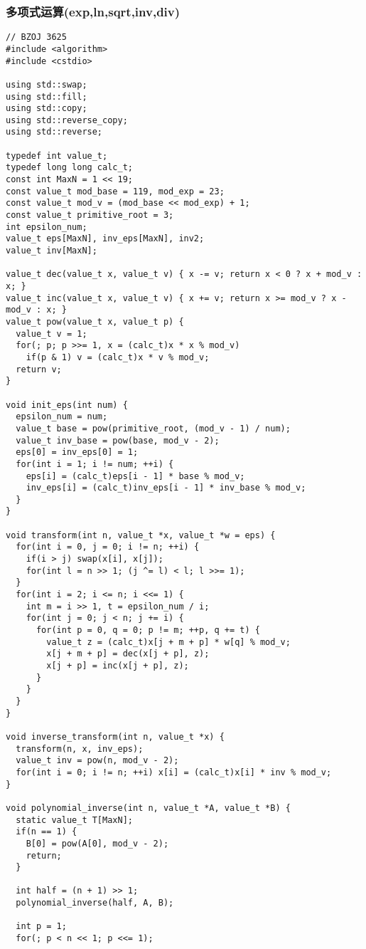 \subsubsection{多项式运算(exp,ln,sqrt,inv,div)}
\begin{verbatim}
// BZOJ 3625
#include <algorithm>
#include <cstdio>

using std::swap;
using std::fill;
using std::copy;
using std::reverse_copy;
using std::reverse;

typedef int value_t;
typedef long long calc_t;
const int MaxN = 1 << 19;
const value_t mod_base = 119, mod_exp = 23;
const value_t mod_v = (mod_base << mod_exp) + 1;
const value_t primitive_root = 3;
int epsilon_num;
value_t eps[MaxN], inv_eps[MaxN], inv2;
value_t inv[MaxN];

value_t dec(value_t x, value_t v) { x -= v; return x < 0 ? x + mod_v : x; }
value_t inc(value_t x, value_t v) { x += v; return x >= mod_v ? x - mod_v : x; }
value_t pow(value_t x, value_t p) {
  value_t v = 1;
  for(; p; p >>= 1, x = (calc_t)x * x % mod_v)
    if(p & 1) v = (calc_t)x * v % mod_v;
  return v;
}

void init_eps(int num) {
  epsilon_num = num;
  value_t base = pow(primitive_root, (mod_v - 1) / num);
  value_t inv_base = pow(base, mod_v - 2);
  eps[0] = inv_eps[0] = 1;
  for(int i = 1; i != num; ++i) {
    eps[i] = (calc_t)eps[i - 1] * base % mod_v;
    inv_eps[i] = (calc_t)inv_eps[i - 1] * inv_base % mod_v;
  }
}

void transform(int n, value_t *x, value_t *w = eps) {
  for(int i = 0, j = 0; i != n; ++i) {
    if(i > j) swap(x[i], x[j]);
    for(int l = n >> 1; (j ^= l) < l; l >>= 1);
  }
  for(int i = 2; i <= n; i <<= 1) {
    int m = i >> 1, t = epsilon_num / i;
    for(int j = 0; j < n; j += i) {
      for(int p = 0, q = 0; p != m; ++p, q += t) {
        value_t z = (calc_t)x[j + m + p] * w[q] % mod_v;
        x[j + m + p] = dec(x[j + p], z);
        x[j + p] = inc(x[j + p], z);
      }
    }
  }
}

void inverse_transform(int n, value_t *x) {
  transform(n, x, inv_eps);
  value_t inv = pow(n, mod_v - 2);
  for(int i = 0; i != n; ++i) x[i] = (calc_t)x[i] * inv % mod_v;
}

void polynomial_inverse(int n, value_t *A, value_t *B) {
  static value_t T[MaxN];
  if(n == 1) {
    B[0] = pow(A[0], mod_v - 2);
    return;
  }

  int half = (n + 1) >> 1;
  polynomial_inverse(half, A, B);

  int p = 1;
  for(; p < n << 1; p <<= 1);


\end{verbatim}
